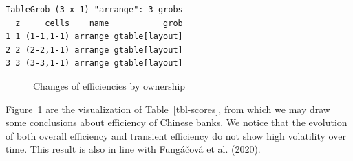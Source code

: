 \documentclass[
  12pt,
  a4paper,
]{scrreprt}
\begin{document}
{{{{\begin{verbatim}
TableGrob (3 x 1) "arrange": 3 grobs
  z     cells    name           grob
1 1 (1-1,1-1) arrange gtable[layout]
2 2 (2-2,1-1) arrange gtable[layout]
3 3 (3-3,1-1) arrange gtable[layout]
\end{verbatim}

\begin{figure}


\caption{\label{fig-decomposition}Changes of efficiencies by ownership}

\end{figure}%

Figure~\ref{fig-decomposition} are the visualization of
Table~\ref{tbl-scores}, from which we may draw some conclusions about
efficiency of Chinese banks. We notice that the evolution of both
overall efficiency and transient efficiency do not show high volatility
over time. This result is also in line with Fungáčová et al. (2020).

}}}}
\end{document}
